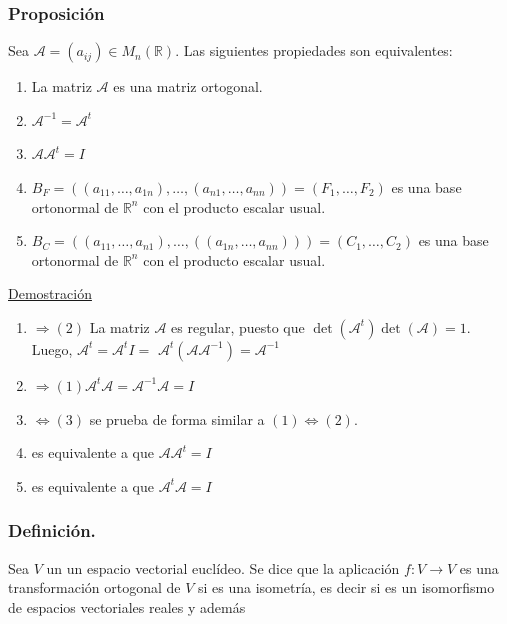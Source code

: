 \documentclass[12pt, a4paper, ones, notitlepage, openany,titlepage]{article}
\newcommand{\demostracion}{\noindent\underline{Demostración}}
\begin{document}
\subsubsection{Proposición}
Sea $\mathcal{A}=\left(a_{i j}\right) \in M_{n}(\mathbb{R})$. Las siguientes propiedades son equivalentes:
\begin{enumerate}[label=(\arabic*)]
	\item La matriz $\mathcal{A}$ es una matriz ortogonal.
	\item $\mathcal{A}^{-1}=\mathcal{A}^{t}$
	\item $\mathcal{A} \mathcal{A}^{t}=I$
	\item $B_{F}=\left(\left(a_{11}, \ldots, a_{1 n}\right), \ldots,\left(a_{n 1}, \ldots, a_{n n}\right)\right) = \left(F_1,\ldots,F_2\right)$ es una base ortonormal de $\mathbb{R}^{n}$ con el producto escalar usual.
	\item $B_{C}=\left(\left(a_{11}, \ldots, a_{n 1}\right), \ldots,\left(\left(a_{1 n}, \ldots, a_{n n}\right)\right)\right) = \left(C_1,\ldots,C_2\right)$ es una base ortonormal de $\mathbb{R}^{n}$ con el producto escalar usual.
\end{enumerate}

\demostracion
\begin{enumerate}[label=(\arabic*)]
	\item $\Rightarrow(2)$ La matriz $\mathcal{A}$ es regular, puesto que $\operatorname{det}\left(\mathcal{A}^{t}\right) \operatorname{det}(\mathcal{A})=1$. Luego, $\mathcal{A}^{t}=\mathcal{A}^{t} I=$ $\mathcal{A}^{t}\left(\mathcal{A} \mathcal{A}^{-1}\right)=\mathcal{A}^{-1}$
	
	\item $\Rightarrow(1) \mathcal{A}^{t} \mathcal{A}=\mathcal{A}^{-1} \mathcal{A}=I$
	
	\item $\Leftrightarrow(3)$ se prueba de forma similar a $(1) \Leftrightarrow(2)$.
	
	\item es equivalente a que $\mathcal{A} \mathcal{A}^{t}=I$
	
	\item es equivalente a que $\mathcal{A}^{t} \mathcal{A}=I$ 
\end{enumerate}

\subsubsection{Definición.}
Sea $V$ un un espacio vectorial euclídeo. Se dice que la aplicación $f: V \rightarrow V$ es una transformación ortogonal de $V$ si es una isometría, es decir si es un isomorfismo de espacios vectoriales reales y además
\end{document}
